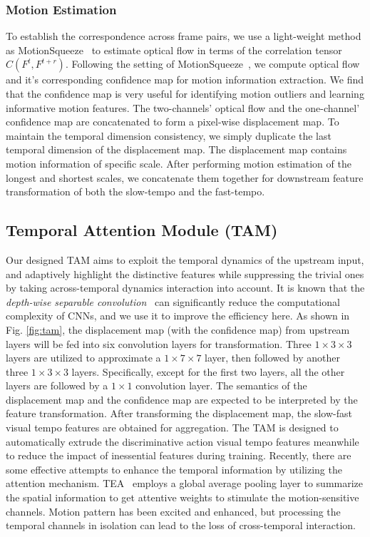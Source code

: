 \documentclass[journal]{IEEEtran}
\begin{document}
\subsubsection{Motion Estimation}
To establish the correspondence across frame pairs, we use a light-weight method as MotionSqueeze~\cite{kwon2020motionsqueeze} to estimate optical flow in terms of the correlation tensor $C(F^{t}, F^{t+r})$. Following the setting of MotionSqueeze~\cite{kwon2020motionsqueeze}, we compute optical flow and it's corresponding confidence map for motion information extraction. We find that the confidence map is very useful for identifying motion outliers and learning informative motion features.
The two-channels' optical flow and the one-channel' confidence map are concatenated to form a pixel-wise displacement map. To maintain the temporal dimension consistency, we simply duplicate the last temporal dimension of the displacement map. The displacement map contains motion information of specific scale. After performing motion estimation of the longest and shortest scales, we concatenate them together for downstream feature transformation of both the slow-tempo and the fast-tempo.

\subsection{Temporal Attention Module (TAM)}
Our designed TAM aims to exploit the temporal dynamics of the upstream input, and adaptively highlight the distinctive features while suppressing the trivial ones by taking across-temporal dynamics interaction into account. It is known that the \textit{depth-wise separable convolution}~\cite{t2020Zhang} can significantly reduce the computational complexity of CNNs, and we use it to improve the efficiency here. As shown in Fig. \ref{fig:tam}, the displacement map (with the confidence map) from upstream layers will be fed into six convolution layers for transformation. Three $1 \times 3 \times 3$ layers are utilized to approximate a $1\times 7 \times 7$ layer, then followed by another three $1 \times 3 \times 3$ layers. Specifically, except for the first two layers, all the other layers are followed by a $1 \times 1$ convolution layer. The semantics of the displacement map and the confidence map are expected to be interpreted by the feature transformation.
After transforming the displacement map, the slow-fast visual tempo features are obtained for aggregation. The TAM is designed to automatically extrude the discriminative action visual tempo features meanwhile to reduce the impact of inessential features during training. Recently, there are some effective attempts to enhance the temporal information by utilizing the attention mechanism. TEA~\cite{li2020tea} employs a global average pooling layer to summarize the spatial information to get attentive weights to stimulate the motion-sensitive channels. Motion pattern has been excited and enhanced, but processing the temporal channels in isolation can lead to the loss of cross-temporal interaction.
\end{document}
